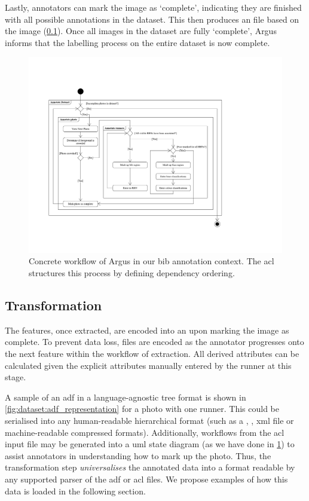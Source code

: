 Lastly, annotators can mark the image as `complete', indicating they are finished with all possible annotations in the dataset. This then produces an  file based on the image (\cref{sec:dataset:process:transformation}). Once all images in the dataset are fully `complete', Argus informs that the labelling process on the entire dataset is now complete.

\begin{landscape}
\begin{figure}[p]
  \centering
  \includegraphics[width=0.9\paperwidth]{images/dataset/concrete_workflow}
  \caption[Concrete workflow example using Argus]{Concrete workflow of Argus in our bib annotation context. The \gls{acl} structures this process by defining dependency ordering.}
  \label{fig:dataset:process:argus_workflow}
\end{figure}
\end{landscape}

\subsection{Transformation}
\label{sec:dataset:process:transformation}

The features, once extracted, are encoded into an  upon marking the image as complete. To prevent data loss, files are encoded as the annotator progresses onto the next feature within the workflow of extraction. All derived attributes can be calculated given the explicit attributes manually entered by the runner at this stage.

A sample of an \gls{adf} in a language-agnostic tree format is shown in \cref{fig:dataset:adf_representation} for a photo with one runner. This could be serialised into any human-readable hierarchical format (such as a , , \gls{xml} file or machine-readable compressed formats). Additionally, workflows from the \gls{acl} input file may be generated into a \gls{uml} state diagram (as we have done in \cref{fig:dataset:process:argus_workflow}) to assist annotators in understanding how to mark up the photo. Thus, the transformation step \textit{universalises} the annotated data into a format readable by any supported parser of the \gls{adf} or \gls{acl} files. We propose examples of how this data is loaded in the following section.

